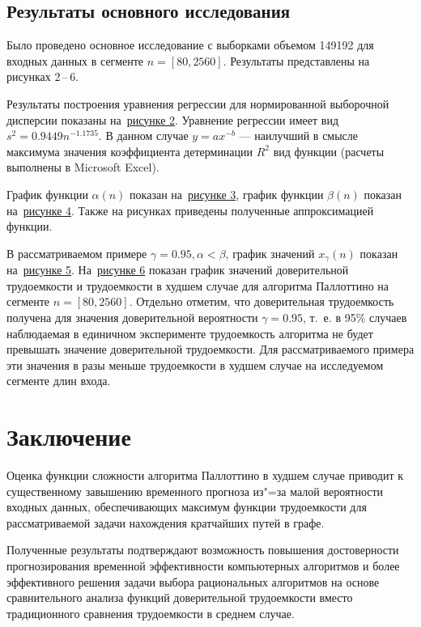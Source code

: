 \documentclass[a4paper,fontsize=14pt]{article}
\begin{document}
\subsection{Результаты основного исследования} \label{subsec:results_part_2}

Было проведено основное исследование с выборками объемом 149192 для входных данных в сегменте $n = [80, 2560]$. Результаты представлены на рисунках 2\,--\,6.

Результаты построения уравнения регрессии для нормированной выборочной дисперсии показаны на~\hyperref[image2]{рисунке 2}. Уравнение регрессии имеет вид $s^2 = 0.9449n^{-1.1735}$. В данном случае $y = ax^{-b}$ — наилучший в смысле максимума значения коэффициента детерминации $R^2$ вид функции (расчеты выполнены в Microsoft Excel).

График функции $\alpha(n)$ показан на~\hyperref[image3]{рисунке 3}, график функции $\beta(n)$ показан на~\hyperref[image4]{рисунке 4}. Также на рисунках приведены полученные аппроксимацией функции.

В рассматриваемом примере $\gamma = 0.95, \alpha < \beta$, график значений $x_\gamma(n)$ показан на~\hyperref[image5]{рисунке 5}. На~\hyperref[image6]{рисунке 6} показан график значений доверительной трудоемкости и трудоемкости в худшем случае для алгоритма Паллоттино на сегменте $n = [80, 2560]$. Отдельно отметим, что доверительная трудоемкость получена для значения доверительной вероятности $\gamma = 0.95$, т.~е. в 95\% случаев наблюдаемая в единичном эксперименте трудоемкость алгоритма не будет превышать значение доверительной трудоемкости. Для рассматриваемого примера эти значения в разы меньше трудоемкости в худшем случае на исследуемом сегменте длин входа.

\section{Заключение} \label{sec:conclusion}

Оценка функции сложности алгоритма Паллоттино в худшем случае приводит к существенному завышению временного прогноза из"=за малой вероятности входных данных, обеспечивающих максимум функции трудоемкости для рассматриваемой задачи нахождения кратчайших путей в графе.

Полученные результаты подтверждают возможность повышения достоверности прогнозирования временной эффективности компьютерных алгоритмов и более эффективного решения задачи выбора рациональных алгоритмов на основе сравнительного анализа функций доверительной трудоемкости вместо традиционного сравнения трудоемкости в среднем случае.
\end{document}
